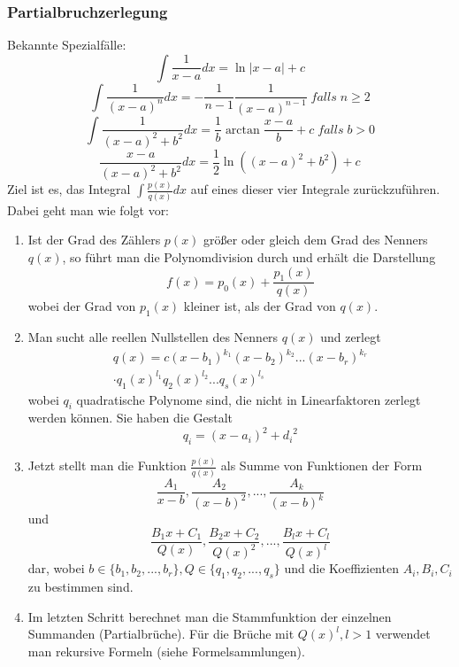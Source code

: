 \documentclass[a4paper,twocolumn,10pt]{article}
\begin{document}
\subsubsection{Partialbruchzerlegung}
Bekannte Spezialfälle:
\begin{equation*}
\int \frac{1}{x-a}dx=\ln|x-a|+c
\end{equation*}
\begin{equation*}
\int \frac{1}{(x-a)^n}dx=-\frac{1}{n-1}\frac{1}{(x-a)^{n-1}}\;falls\;n\geq 2
\end{equation*}
\begin{equation*}
\int \frac{1}{(x-a)^2+b^2}dx=\frac{1}{b}\arctan\frac{x-a}{b}+c\;falls\;b>0
\end{equation*}
\begin{equation*}
\frac{x-a}{(x-a)^2+b^2}dx=\frac{1}{2}\ln((x-a)^2+b^2)+c
\end{equation*}
Ziel ist es, das Integral $\int \frac{p(x)}{q(x)}dx$ auf eines dieser vier Integrale zurückzuführen. Dabei geht man wie folgt vor:
\begin{enumerate}
\item Ist der Grad des Zählers $p(x)$ größer oder gleich dem Grad des Nenners $q(x)$, so führt man die Polynomdivision durch und erhält die Darstellung
\begin{equation*}
f(x)=p_0(x)+\frac{p_1(x)}{q(x)}
\end{equation*}
wobei der Grad von $p_1(x)$ kleiner ist, als der Grad von $q(x)$.
\item Man sucht alle reellen Nullstellen des Nenners $q(x)$ und zerlegt
\begin{equation*}
\begin{split}q(x)=c(x-b_1)^{k_1}(x-b_2)^{k_2}...(x-b_r)^{k_r} \\ \cdot q_1(x)^{l_1}q_2(x)^{l_2}...q_s(x)^{l_s} \end{split}
\end{equation*}
wobei $q_i$ quadratische Polynome sind, die nicht in Linearfaktoren zerlegt werden können. Sie haben die Gestalt
\begin{equation*}
q_i=(x-a_i)^2+{d_i}^2
\end{equation*}
\item Jetzt stellt man die Funktion $\frac{p(x)}{q(x)}$ als Summe von Funktionen der Form
\begin{equation*}
\frac{A_1}{x-b},\frac{A_2}{(x-b)^2},...,\frac{A_k}{(x-b)^k}
\end{equation*}
und
\begin{equation*}
\frac{B_1x+C_1}{Q(x)},\frac{B_2x+C_2}{Q(x)^2},...,\frac{B_lx+C_l}{Q(x)^l}
\end{equation*}
dar, wobei $b\in \{b_1,b_2,...,b_r\},Q\in\{q_1,q_2,...,q_s\}$ und die Koeffizienten $A_i, B_i, C_i$ zu bestimmen sind.
\item Im letzten Schritt berechnet man die Stammfunktion der einzelnen Summanden (Partialbrüche). Für die Brüche mit $Q(x)^l,l>1$ verwendet man rekursive Formeln (siehe Formelsammlungen).
\end{enumerate}
\end{document}
